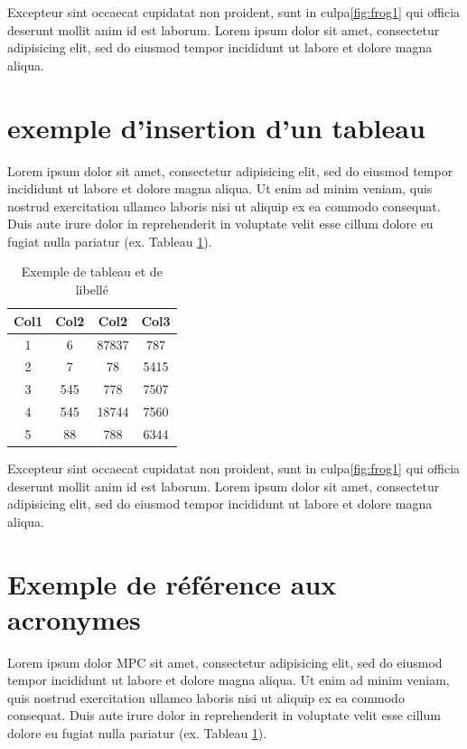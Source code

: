 Excepteur sint occaecat cupidatat
non proident, sunt in culpa\ref{fig:frog1} qui officia deserunt mollit anim id est laborum.
Lorem ipsum dolor sit amet, consectetur adipisicing elit, sed do eiusmod tempor incididunt ut
labore et dolore magna aliqua. 

\section{exemple d'insertion d'un tableau}
Lorem ipsum dolor sit amet, consectetur adipisicing elit, sed do eiusmod tempor incididunt ut
labore et dolore magna aliqua. Ut enim ad minim veniam, quis nostrud exercitation ullamco
laboris nisi ut aliquip ex ea commodo consequat. Duis aute irure dolor in reprehenderit in
voluptate velit esse cillum dolore eu fugiat nulla pariatur (ex. Tableau \ref{table:1}). 
\begin{table}[h!]
    \centering
    \begin{tabular}{||c c c c||} 
     \hline
     Col1 & Col2 & Col2 & Col3 \\ [0.5ex] 
     \hline\hline
     1 & 6 & 87837 & 787 \\ 
     2 & 7 & 78 & 5415 \\
     3 & 545 & 778 & 7507 \\
     4 & 545 & 18744 & 7560 \\
     5 & 88 & 788 & 6344 \\ [1ex] 
     \hline
    \end{tabular}
    \caption{Exemple de tableau et de libellé}
    \label{table:1}
\end{table}


Excepteur sint occaecat cupidatat
non proident, sunt in culpa\ref{fig:frog1} qui officia deserunt mollit anim id est laborum.
Lorem ipsum dolor sit amet, consectetur adipisicing elit, sed do eiusmod tempor incididunt ut
labore et dolore magna aliqua. 


\section{Exemple de référence aux acronymes}
Lorem ipsum dolor \ac{MPC} sit amet, consectetur adipisicing elit, sed do eiusmod tempor incididunt ut
labore et dolore magna aliqua. Ut enim ad minim veniam, quis nostrud exercitation ullamco
laboris nisi ut aliquip ex ea commodo consequat. Duis aute irure dolor in reprehenderit in
voluptate velit esse cillum dolore eu fugiat nulla pariatur (ex. Tableau \ref{table:1}). 
